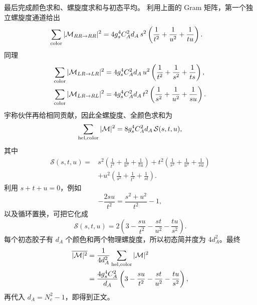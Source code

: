 \begin{derivation}[胶子散射的颜色与偏振求和]
最后完成颜色求和、螺旋度求和与初态平均。
利用上面的 Gram 矩阵，第一个独立螺旋度通道给出
\begin{align*}
 \sum_{\rm color}|\mathcal M_{RR\to RR}|^2
 &=4g_s^4C_A^2d_A\,s^2
 \left(
 \frac1{t^2}+\frac1{u^2}+\frac1{tu}
 \right).
\end{align*}
同理
\begin{align*}
 \sum_{\rm color}|\mathcal M_{LR\to LR}|^2
 &=4g_s^4C_A^2d_A\,u^2
 \left(
 \frac1{t^2}+\frac1{s^2}+\frac1{ts}
 \right),\\
 \sum_{\rm color}|\mathcal M_{LR\to RL}|^2
 &=4g_s^4C_A^2d_A\,t^2
 \left(
 \frac1{s^2}+\frac1{u^2}+\frac1{su}
 \right).
\end{align*}
宇称伙伴再给相同贡献，因此全螺旋度、全颜色求和为
\begin{equation*}
 \sum_{\rm hel,color}|\mathcal M|^2
 =8g_s^4C_A^2d_A\,\mathcal S(s,t,u),
\end{equation*}
其中
\begin{align*}
 \mathcal S(s,t,u)={}&
 s^2\left(\frac1{t^2}+\frac1{u^2}+\frac1{tu}\right)
 +t^2\left(\frac1{s^2}+\frac1{u^2}+\frac1{su}\right)\\
 &+u^2\left(\frac1{s^2}+\frac1{t^2}+\frac1{st}\right).
\end{align*}
利用 $s+t+u=0$，例如
\begin{equation*}
 -\frac{2su}{t^2}
 =\frac{s^2+u^2}{t^2}-1,
\end{equation*}
以及循环置换，可把它化成
\begin{equation*}
 \mathcal S(s,t,u)
 =2\left(
 3-\frac{su}{t^2}-\frac{st}{u^2}-\frac{tu}{s^2}
 \right).
\end{equation*}
每个初态胶子有 $d_A$ 个颜色和两个物理螺旋度，所以初态简并度为 $4d_A^2$。最终
\begin{align*}
 \overline{|\mathcal M|^2}
 &=\frac{1}{4d_A^2}
 \sum_{\rm hel,color}|\mathcal M|^2\\
 &=\frac{4g_s^4C_A^2}{d_A}
 \left(
 3-\frac{su}{t^2}-\frac{st}{u^2}-\frac{tu}{s^2}
 \right),
\end{align*}
再代入 $d_A=N_c^2-1$，即得到正文。
\end{derivation}


